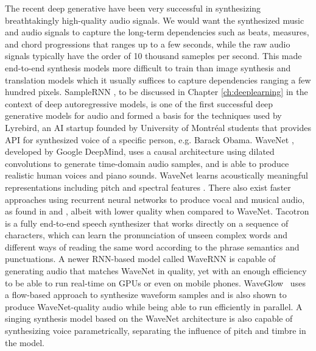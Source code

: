 The recent deep generative have been very successful in synthesizing breathtakingly high-quality audio signals.
We would want the synthesized music and audio signals to capture the long-term dependencies such as beats, measures, and chord progressions that ranges up to a few seconds, while the raw audio signals typically have the order of 10 thousand sameples per second.
This made end-to-end synthesis models more difficult to train than image synthesis and translation models which it usually suffices to capture dependencies ranging a few hundred pixels.
SampleRNN \cite{mehri2016samplernn}, to be discussed in Chapter \ref{ch:deeplearning} in the context of deep autoregressive models, is one of the first successful deep generative models for audio and formed a basis for the techniques used by Lyrebird, an AI startup founded by University of Montr\'{e}al students that provides API for synthesized voice of a specific person, e.g. Barack Obama.
WaveNet \cite{oord2016wavenet}, developed by Google DeepMind, uses a causal architecture using dilated convolutions to generate time-domain audio samples, and is able to produce realistic human voices and piano sounds.
WaveNet learns acoustically meaningful representations including pitch and spectral features \cite{hua2018wavenet}.
There also exist faster approaches using recurrent neural networks to produce vocal and musical audio, as found in \cite{nayebi2015gruv} and \cite{kalingeri2016generation}, albeit with lower quality when compared to WaveNet.
Tacotron \cite{wang2017tacotron, shen2018tacotron} is a fully end-to-end speech synthesizer that works directly on a sequence of characters, which can learn the pronunciation of unseen complex words and different ways of reading the same word according to the phrase semantics and punctuations.
A newer RNN-based model called WaveRNN \cite{kalchbrenner2018wavernn} is capable of generating audio that matches WaveNet in quality, yet with an enough efficiency to be able to run real-time on GPUs or even on mobile phones.
WaveGlow~\cite{prenger2019waveglow} uses a flow-based approach to synthesize waveform samples and is also shown to produce WaveNet-quality audio while being able to run efficiently in parallel.
A singing synthesis model \cite{blaauw2017singing} based on the WaveNet architecture is also capable of synthesizing voice parametrically, separating the influence of pitch and timbre in the model.

